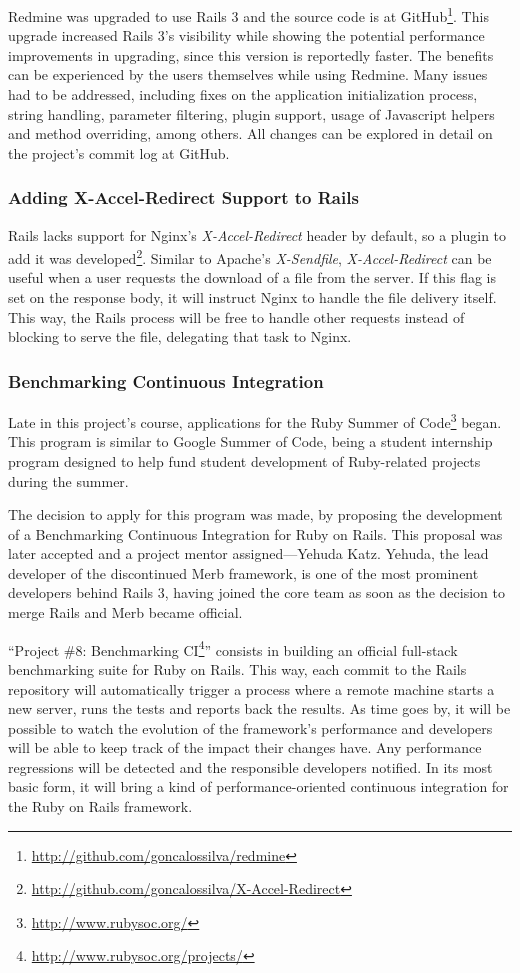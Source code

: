 Redmine was upgraded to use Rails 3 and the source code is at GitHub\footnote{\url{http://github.com/goncalossilva/redmine}}. This upgrade increased Rails 3's visibility while showing the potential performance improvements in upgrading, since this version is reportedly faster. The benefits can be experienced by the users themselves while using Redmine. Many issues had to be addressed, including fixes on the application initialization process, string handling, parameter filtering, plugin support, usage of Javascript helpers and method overriding, among others. All changes can be explored in detail on the project's commit log at GitHub.


\subsubsection{Adding X-Accel-Redirect Support to Rails}
Rails lacks support for Nginx's \textit{X-Accel-Redirect} header by default, so a plugin to add it was developed\footnote{\url{http://github.com/goncalossilva/X-Accel-Redirect}}. Similar to Apache's \textit{X-Sendfile}, \textit{X-Accel-Redirect} can be useful when a user requests the download of a file from the server. If this flag is set on the response body, it will instruct Nginx to handle the file delivery itself. This way, the Rails process will be free to handle other requests instead of blocking to serve the file, delegating that task to Nginx.


\subsubsection{Benchmarking Continuous Integration}
Late in this project's course, applications for the Ruby Summer of Code\footnote{\url{http://www.rubysoc.org/}} began. This program is similar to Google Summer of Code, being a student internship program designed to help fund student development of Ruby-related projects during the summer.

The decision to apply for this program was made, by proposing the development of a Benchmarking Continuous Integration for Ruby on Rails. This proposal was later accepted and a project mentor assigned---Yehuda Katz. Yehuda, the lead developer of the discontinued Merb framework, is one of the most prominent developers behind Rails 3, having joined the core team as soon as the decision to merge Rails and Merb became official.

``Project \#8: Benchmarking CI\footnote{\url{http://www.rubysoc.org/projects/}}'' consists in building an official full-stack benchmarking suite for Ruby on Rails. This way, each commit to the Rails repository will automatically trigger a process where a remote machine starts a new server, runs the tests and reports back the results. As time goes by, it will be possible to watch the evolution of the framework's performance and developers will be able to keep track of the impact their changes have. Any performance regressions will be detected and the responsible developers notified. In its most basic form, it will bring a kind of performance-oriented continuous integration for the Ruby on Rails framework.

